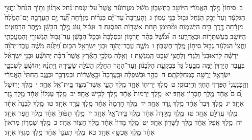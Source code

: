 \documentclass[18pt]{article}
\begin{document}
 {\loc ב~}סִיחוֹן֙ מֶ֣לֶךְ הָאֱמֹרִ֔י הַיּוֹשֵׁ֖ב בְּחֶשְׁבּ֑וֹן מֹשֵׁ֡ל מֵעֲרוֹעֵ֡ר אֲשֶׁר֩ עַל־שְׂפַת־נַ֨חַל אַרְנ֜וֹן וְת֤וֹךְ הַנַּ֙חַל֙ וַחֲצִ֣י הַגִּלְעָ֔ד וְעַד֙ יַבֹּ֣ק הַנַּ֔חַל גְּב֖וּל בְּנֵ֥י עַמּֽוֹן׃ \startlock
 {\loc ג~}וְהָעֲרָבָה֩ עַד־יָ֨ם כִּנְר֜וֹת מִזְרָ֗חָה וְ֠עַ֠ד יָ֣ם הָעֲרָבָ֤ה יָם־הַמֶּ֙לַח֙ מִזְרָ֔חָה דֶּ֖רֶךְ בֵּ֣ית הַיְשִׁמ֑וֹת וּמִ֨תֵּימָ֔ן תַּ֖חַת אַשְׁדּ֥וֹת הַפִּסְגָּֽה׃ \startlock
 {\loc ד~}וּגְב֗וּל ע֚וֹג מֶ֣לֶךְ הַבָּשָׁ֔ן מִיֶּ֖תֶר הָרְפָאִ֑ים הַיּוֹשֵׁ֥ב בְּעַשְׁתָּר֖וֹת וּבְאֶדְרֶֽעִי׃ \startlock
 {\loc ה~}וּ֠מֹשֵׁ֠ל בְּהַ֨ר חֶרְמ֤וֹן וּבְסַלְכָה֙ וּבְכׇל־הַבָּשָׁ֔ן עַד־גְּב֥וּל הַגְּשׁוּרִ֖י וְהַמַּעֲכָתִ֑י וַֽחֲצִי֙ הַגִּלְעָ֔ד גְּב֖וּל סִיח֥וֹן מֶֽלֶךְ־חֶשְׁבּֽוֹן׃ \startlock
 {\loc ו~}מֹשֶׁ֧ה עֶבֶד־יְהֹוָ֛ה וּבְנֵ֥י יִשְׂרָאֵ֖ל הִכּ֑וּם וַֽ֠יִּתְּנָ֠הּ מֹשֶׁ֨ה עֶבֶד־יְהֹוָ֜ה יְרֻשָּׁ֗ה לָרֽאוּבֵנִי֙ וְלַגָּדִ֔י וְלַחֲצִ֖י שֵׁ֥בֶט הַֽמְנַשֶּֽׁה׃ \startlock
 {\loc ז~}וְאֵ֣לֶּה מַלְכֵ֣י הָאָ֡רֶץ אֲשֶׁר֩ הִכָּ֨ה יְהוֹשֻׁ֜עַ וּבְנֵ֣י יִשְׂרָאֵ֗ל בְּעֵ֤בֶר הַיַּרְדֵּן֙ יָ֔מָּה מִבַּ֤עַל גָּד֙ בְּבִקְעַ֣ת הַלְּבָנ֔וֹן וְעַד־הָהָ֥ר הֶחָלָ֖ק הָעֹלֶ֣ה שֵׂעִ֑ירָה וַיִּתְּנָ֨הּ יְהוֹשֻׁ֜עַ לְשִׁבְטֵ֧י יִשְׂרָאֵ֛ל יְרֻשָּׁ֖ה כְּמַחְלְקֹתָֽם׃ \startlock
 {\loc ח~}בָּהָ֣ר וּבַשְּׁפֵלָ֗ה וּבָֽעֲרָבָה֙ וּבָ֣אֲשֵׁד֔וֹת וּבַמִּדְבָּ֖ר וּבַנֶּ֑גֶב הַֽחִתִּי֙ הָאֱמֹרִ֔י וְהַֽכְּנַעֲנִי֙ הַפְּרִזִּ֔י הַחִוִּ֖י וְהַיְבוּסִֽי׃ \startlock
 {\loc ט~}מֶ֥לֶךְ יְרִיח֖וֹ אֶחָ֑ד      מֶ֧לֶךְ הָעַ֛י אֲשֶׁר־מִצַּ֥ד בֵּֽית־אֵ֖ל אֶחָֽד׃ \startlock
 {\loc י~}מֶ֤לֶךְ יְרֽוּשָׁל ַ֙͏ְם ם֙ אֶחָ֔ד      מֶ֥לֶךְ חֶבְר֖וֹן אֶחָֽד׃ \startlock
 {\loc יא~}מֶ֤לֶךְ יַרְמוּת֙ אֶחָ֔ד      מֶ֥לֶךְ לָכִ֖ישׁ אֶחָֽד׃ \startlock
 {\loc יב~}מֶ֤לֶךְ עֶגְלוֹן֙ אֶחָ֔ד      מֶ֥לֶךְ גֶּ֖זֶר אֶחָֽד׃ \startlock
 {\loc יג~}מֶ֤לֶךְ דְּבִר֙ אֶחָ֔ד      מֶ֥לֶךְ גֶּ֖דֶר אֶחָֽד׃ \startlock
 {\loc יד~}מֶ֤לֶךְ חׇרְמָה֙ אֶחָ֔ד      מֶ֥לֶךְ עֲרָ֖ד אֶחָֽד׃ \startlock
 {\loc טו~}מֶ֤לֶךְ לִבְנָה֙ אֶחָ֔ד      מֶ֥לֶךְ עֲדֻלָּ֖ם אֶחָֽד׃ \startlock
 {\loc טז~}מֶ֤לֶךְ מַקֵּדָה֙ אֶחָ֔ד      מֶ֥לֶךְ בֵּֽית־אֵ֖ל אֶחָֽד׃ \startlock
 {\loc יז~}מֶ֤לֶךְ תַּפּ֙וּחַ֙ אֶחָ֔ד      מֶ֥לֶךְ חֵ֖פֶר אֶחָֽד׃ \startlock
 {\loc יח~}מֶ֤לֶךְ אֲפֵק֙ אֶחָ֔ד      מֶ֥לֶךְ לַשָּׁר֖וֹן אֶחָֽד׃ \startlock
 {\loc יט~}מֶ֤לֶךְ מָדוֹן֙ אֶחָ֔ד      מֶ֥לֶךְ חָצ֖וֹר אֶחָֽד׃ \startlock
 {\loc כ~}מֶ֣לֶךְ שִׁמְר֤וֹן מְרֹאון֙ אֶחָ֔ד      מֶ֥לֶךְ אַכְשָׁ֖ף אֶחָֽד׃ \startlock
 {\loc כא~}מֶ֤לֶךְ תַּעְנַךְ֙ אֶחָ֔ד      מֶ֥לֶךְ מְגִדּ֖וֹ אֶחָֽד׃ \startlock
\end{document}
